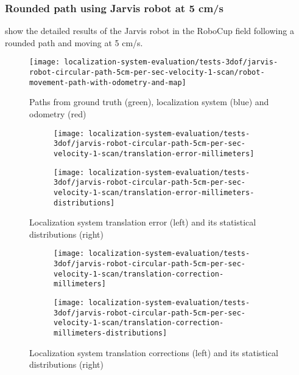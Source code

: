 \subsubsection{Rounded path using Jarvis robot at 5 cm/s}

 show the detailed results of the Jarvis robot in the RoboCup field following a rounded path and moving at 5 cm/s.

\begin{figure}[H]
	\centering
	\texttt{[image: localization-system-evaluation/tests-3dof/jarvis-robot-circular-path-5cm-per-sec-velocity-1-scan/robot-movement-path-with-odometry-and-map]}
	\caption{Paths from ground truth (green), localization system (blue) and odometry (red)}
	\label{fig:localization-system-evaluation_jarvis-robot-circular-path-5cm-per-sec-velocity-1-scan}
\end{figure}

\begin{figure}[H]
	\centering
	\begin{subfigure}[h]{.497\textwidth}
		\centering
		\texttt{[image: localization-system-evaluation/tests-3dof/jarvis-robot-circular-path-5cm-per-sec-velocity-1-scan/translation-error-millimeters]}
	\end{subfigure}
	\begin{subfigure}[h]{.497\textwidth}
		\centering
		\texttt{[image: localization-system-evaluation/tests-3dof/jarvis-robot-circular-path-5cm-per-sec-velocity-1-scan/translation-error-millimeters-distributions]}
	\end{subfigure}
	\caption{Localization system translation error (left) and its statistical distributions (right)}
	\label{fig:localization-system-evaluation_jarvis-robot-circular-path-5cm-per-sec-velocity-1-scan_translation-errors}
\end{figure}

\begin{figure}[H]
	\centering
	\begin{subfigure}[h]{.497\textwidth}
		\centering
		\texttt{[image: localization-system-evaluation/tests-3dof/jarvis-robot-circular-path-5cm-per-sec-velocity-1-scan/translation-correction-millimeters]}
	\end{subfigure}
	\begin{subfigure}[h]{.497\textwidth}
		\centering
		\texttt{[image: localization-system-evaluation/tests-3dof/jarvis-robot-circular-path-5cm-per-sec-velocity-1-scan/translation-correction-millimeters-distributions]}
	\end{subfigure}
	\caption{Localization system translation corrections (left) and its statistical distributions (right)}
	\label{fig:localization-system-evaluation_jarvis-robot-circular-path-5cm-per-sec-velocity-1-scan_translation-errors-corrections}
\end{figure}

